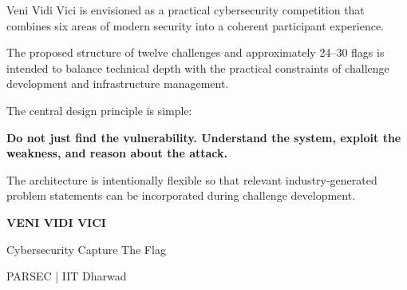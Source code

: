 \documentclass[11pt,a4paper]{article}
\begin{document}
Veni Vidi Vici is envisioned as a practical cybersecurity competition
that combines six areas of modern security into a coherent
participant experience.

The proposed structure of twelve challenges and approximately
24--30 flags is intended to balance technical depth with the
practical constraints of challenge development and infrastructure
management.

The central design principle is simple:

\begin{center}

\Large
\textbf{
Do not just find the vulnerability.
Understand the system, exploit the weakness, and reason about the
attack.
}

\end{center}

The architecture is intentionally flexible so that relevant
industry-generated problem statements can be incorporated during
challenge development.

\vfill

\begin{center}

\textbf{VENI VIDI VICI}

\vspace{0.15cm}

Cybersecurity Capture The Flag

\vspace{0.15cm}

PARSEC | IIT Dharwad

\end{center}


\end{document}
